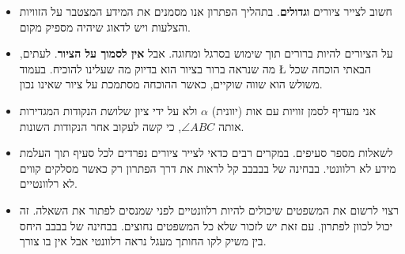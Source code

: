 \documentclass[12pt,a4paper]{article}
\begin{document}
\begin{itemize}
\item
חשוב לצייר ציורים 
\textbf{וגדולים}.
בתהליך הפתרון אנו מסמנים את המידע המצטבר על הזוויות והצלעות ויש לדאוג שיהיה מספיק מקום.

\item
על הציורים להיות ברורים תוך שימוש בסרגל ומחוגה. אבל 
\textbf{אין לסמוך על הציור}.
לעתים, מה שנראה ברור בציור הוא בדיוק מה שעלינו להוכיח. בעמוד 
\L{\pageref{}}
הבאתי הוכחה שכל משולש הוא שווה שוקיים, כאשר ההוכחה מסתמכת על ציור שאינו נכון.

\item
אני מעדיף לסמן זוויות עם אות (יוונית)
$\alpha$
ולא על ידי ציון שלושת הנקודות המגדירות אותה
$\angle ABC$,
כי קשה לעקוב אחר הנקודות השונות.

\item
לשאלות מספר סעיפים. במקרים רבים כדאי לצייר ציורים נפרדים לכל סעיף תוך העלמת מידע לא רלוונטי. בבחינה של בבבבב קל לראות את דרך הפתרון רק כאשר מסלקים קווים לא רלוונטיים.

\item
רצוי לרשום את המשפטים שיכולים להיות רלוונטיים לפני שמנסים לפתור את השאלה. זה יכול לכוון לפתרון. עם זאת יש לזכור שלא כל המשפטים נחוצים. בבחינה של בבבב היחס בין משיק לקו החותך מעגל נראה רלוונטי אבל אין בו צורך.


\end{itemize}
\end{document}
